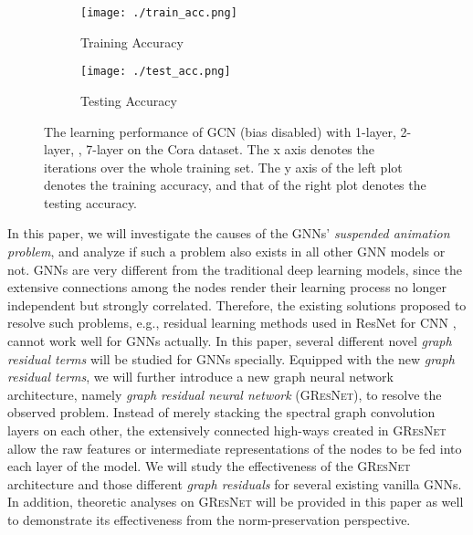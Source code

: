 \documentclass{article}
\newcommand{\gresnet}{\textsc{GResNet}}
\newcommand{\gcn}{\textsc{GCN}}
\begin{document}
\begin{figure}
\vspace{-40pt}
    \centering
    \begin{subfigure}[b]{.45\textwidth}
    	\texttt{[image: ./train\_acc.png]}
    	\caption{Training Accuracy}\label{fig:gcn_acc_train}
    \end{subfigure}\hfill
    \begin{subfigure}[b]{.45\textwidth}
    	\texttt{[image: ./test\_acc.png]}
    	\caption{Testing Accuracy}\label{fig:gcn_acc_test}
    \end{subfigure}\vspace{-5pt}
    \caption{The learning performance of {\gcn} (bias disabled) with 1-layer, 2-layer, , 7-layer on the Cora dataset. The x axis denotes the iterations over the whole training set. The y axis of the left plot denotes the training accuracy, and that of the right plot denotes the testing accuracy.}\label{fig:gcn_acc_analysis}
\vspace{-15pt}
\end{figure}


In this paper, we will investigate the causes of the GNNs' \textit{suspended animation problem}, and analyze if such a problem also exists in all other GNN models or not. GNNs are very different from the traditional deep learning models, since the extensive connections among the nodes render their learning process no longer independent but strongly correlated. Therefore, the existing solutions proposed to resolve such problems, e.g., residual learning methods used in ResNet for CNN \cite{HZRS15}, cannot work well for GNNs actually. In this paper, several different novel \textit{graph residual terms} will be studied for GNNs specially. Equipped with the new \textit{graph residual terms}, we will further introduce a new graph neural network architecture, namely \textit{graph residual neural network} ({\gresnet}), to resolve the observed problem. Instead of merely stacking the spectral graph convolution layers on each other, the extensively connected high-ways created in {\gresnet} allow the raw features or intermediate representations of the nodes to be fed into each layer of the model. We will study the effectiveness of the {\gresnet} architecture and those different \textit{graph residuals} for several existing vanilla GNNs. In addition, theoretic analyses on {\gresnet} will be provided in this paper as well to demonstrate its effectiveness from the norm-preservation perspective.
\end{document}
